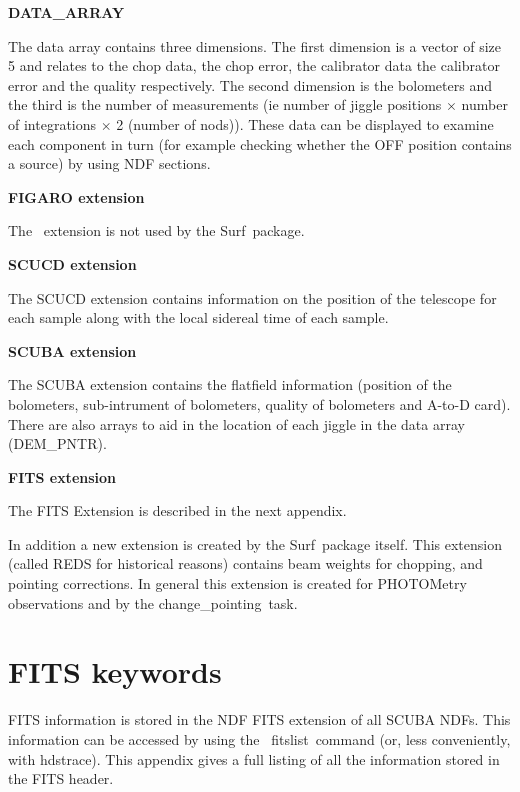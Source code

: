 \documentclass[twoside,11pt]{article}
\newcommand{\scusoft}          {{\sc Surf}}
\newcommand{\Kappa}{\xref{{\sc{Kappa}}}{sun95}{}}
\newcommand{\Figaro}{\xref{{\sc{Figaro}}}{sun86}{}}
\newcommand{\task}[1]{{\sf #1}}
\newcommand{\chgpnt}{\htmlref{\task{change\_pointing}}{CHANGE_POINTING}}
\newcommand{\fitslist}{\xref{\task{fitslist}}{sun95}{FITSLIST}}
\newcommand{\hdstrace}{\xref{\task{hdstrace}}{sun102}{}}
\newcommand{\htmlref}[2]{#1}
\newcommand{\xref}[3]{#1}
\newcommand{\xlabel}[1]{}
\begin{document}
\begin{description}
\item {\bf DATA\_ARRAY}

The data array contains three dimensions. The first dimension is a vector of
size 5 and relates to the chop data, the chop error, the calibrator data the
calibrator error and the quality respectively. The second dimension is the
bolometers and the third is the number of measurements (ie number of jiggle
positions $\times$ number of integrations $\times$ 2 (number of nods)). These
data can be displayed to examine each component in turn (for example checking
whether the OFF position contains a source) by using NDF sections.

\item {\bf FIGARO extension}

The \Figaro\ extension is not used by the \scusoft\ package.

\item {\bf SCUCD extension}

The SCUCD extension contains information on the position of the telescope for
each sample along with the local sidereal time of each sample.

\item {\bf SCUBA extension}

The SCUBA extension contains the flatfield information (position of the
bolometers, sub-intrument of bolometers, quality of bolometers and A-to-D
card). There are also arrays to aid in the location of each jiggle in the data
array (DEM\_PNTR).

\item {\bf FITS extension}

The FITS Extension is described in the next appendix.

\end{description}


In addition a new extension is created by the \scusoft\ package itself. This
extension (called REDS for historical reasons) contains beam weights for
chopping, and pointing corrections. In general this extension is created for
PHOTOMetry observations and by the \chgpnt\ task.

\section{\xlabel{fits}FITS keywords\label{fits}}

FITS information is stored in the NDF FITS extension of all SCUBA NDFs. This
information can be accessed by using the \Kappa\ \fitslist\ command (or,
less conveniently, with \hdstrace). This appendix gives a full listing
of all the information stored in the FITS header.
\end{document}

